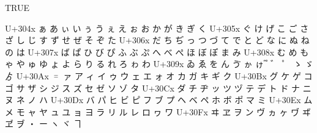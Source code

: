 \documentclass{ltjarticle}\usepackage{luatexja-adjust}
\begin{document}
\par
\newpage\ltjenableadjust[combinevoicedkana] TRUE
{\obeylines\ttfamily
U+304x          ぁ      あ      ぃ      い      ぅ      う      ぇ      え      ぉ      お      か      が      き      ぎ      く
U+305x  ぐ      け      げ      こ      ご      さ      ざ      し      じ      す      ず      せ      ぜ      そ      ぞ      た
U+306x  だ      ち      ぢ      っ      つ      づ      て      で      と      ど      な      に      ぬ      ね      の      は
U+307x  ば      ぱ      ひ      び      ぴ      ふ      ぶ      ぷ      へ      べ      ぺ      ほ      ぼ      ぽ      ま      み
U+308x  む      め      も      ゃ      や      ゅ      ゆ      ょ      よ      ら      り      る      れ      ろ      ゎ      わ
U+309x  ゐ      ゑ      を      ん      ゔ      ゕ      ゖ                      ゙        ゚        ゛      ゜      ゝ      ゞ      ゟ 
U+30Ax  ゠      ァ      ア      ィ      イ      ゥ      ウ      ェ      エ      ォ      オ      カ      ガ      キ      ギ      ク
U+30Bx  グ      ケ      ゲ      コ      ゴ      サ      ザ      シ      ジ      ス      ズ      セ      ゼ      ソ      ゾ      タ
U+30Cx  ダ      チ      ヂ      ッ      ツ      ヅ      テ      デ      ト      ド      ナ      ニ      ヌ      ネ      ノ      ハ
U+30Dx  バ      パ      ヒ      ビ      ピ      フ      ブ      プ      ヘ      ベ      ペ      ホ      ボ      ポ      マ      ミ
U+30Ex  ム      メ      モ      ャ      ヤ      ュ      ユ      ョ      ヨ      ラ      リ      ル      レ      ロ      ヮ      ワ
U+30Fx  ヰ      ヱ      ヲ      ン      ヴ      ヵ      ヶ      ヷ      ヸ      ヹ      ヺ      ・      ー      ヽ      ヾ      ヿ 
\par}
\end{document}
